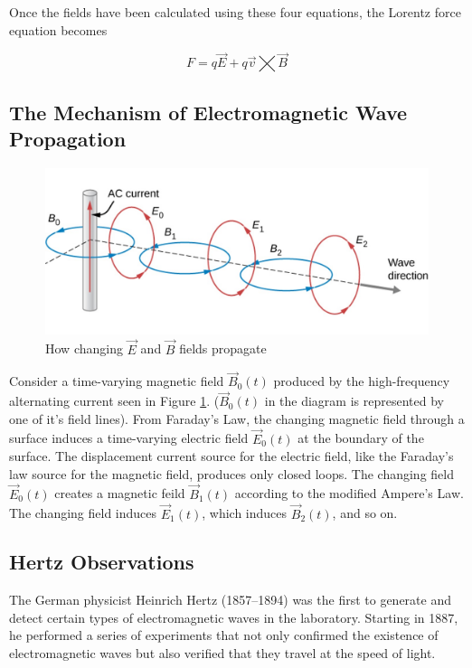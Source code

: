\documentclass[14pt]{memoir}
\begin{document}
Once the fields have been calculated using these four equations, the Lorentz force equation becomes

\begin{equation}
F = q \vec{E} + q \vec{v} \bigtimes \vec{B}
\end{equation}


\subsection{The Mechanism of Electromagnetic Wave Propagation}

\begin{figure}[H]
\begin{center}
\includegraphics[scale=0.5]{fig/fig_16_04.jpg}
\caption{How changing $\vec{E}$ and $\vec{B}$ fields propagate}
\label{fig:16_04}
\end{center}
\end{figure}

Consider a time-varying magnetic field $\vec{B}_0(t)$ produced by the high-frequency alternating current seen in Figure \ref{fig:16_04}. ($\vec{B}_0(t)$ in the diagram is represented by one of it's field lines). From Faraday's Law, the changing magnetic field through a surface induces a time-varying electric field $\vec{E}_0(t)$ at the boundary of the surface. The displacement current source for the electric field, like the Faraday's law source for the magnetic field, produces only closed loops. The changing field $\vec{E}_0(t)$ creates a magnetic feild $\vec{B}_1(t)$ according to the modified Ampere's Law. The changing field induces $\vec{E}_1(t)$, which induces $\vec{B}_2(t)$, and so on. 

\subsection{Hertz Observations}

The German physicist Heinrich Hertz (1857–1894) was the first to generate and detect certain types of electromagnetic waves in the laboratory. Starting in 1887, he performed a series of experiments that not only confirmed the existence of electromagnetic waves but also verified that they travel at the speed of light.
\end{document}
